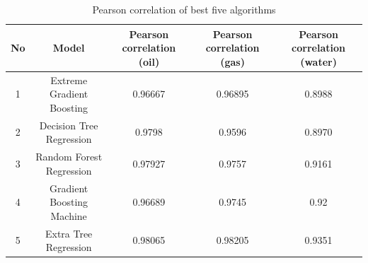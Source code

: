 \documentclass[12pt,a4paper]{report}
\begin{document}
\begin{table}[h]
\caption{Pearson correlation of best five algorithms}
\centering
\begin{adjustbox}{width=1\textwidth}
\small
\begin{tabular}{|c|c|c|c|c|}
\hline
\textbf{No} & \textbf{Model}            & \textbf{Pearson correlation (oil)} & \textbf{Pearson correlation (gas)} & \textbf{Pearson correlation (water)} \\ \hline
1           & Extreme Gradient Boosting & 0.96667                            & 0.96895                            & 0.8988                               \\ \hline
2           & Decision Tree Regression  & 0.9798                             & 0.9596                             & 0.8970                               \\ \hline
3           & Random Forest Regression  & 0.97927                            & 0.9757                             & 0.9161                               \\ \hline
4           & Gradient Boosting Machine & 0.96689                            & 0.9745                             & 0.92                                 \\ \hline
5           & Extra Tree Regression     & 0.98065                            & 0.98205                            & 0.9351                               \\ \hline
\end{tabular}
\end{adjustbox}
\end{table}
\end{document}

